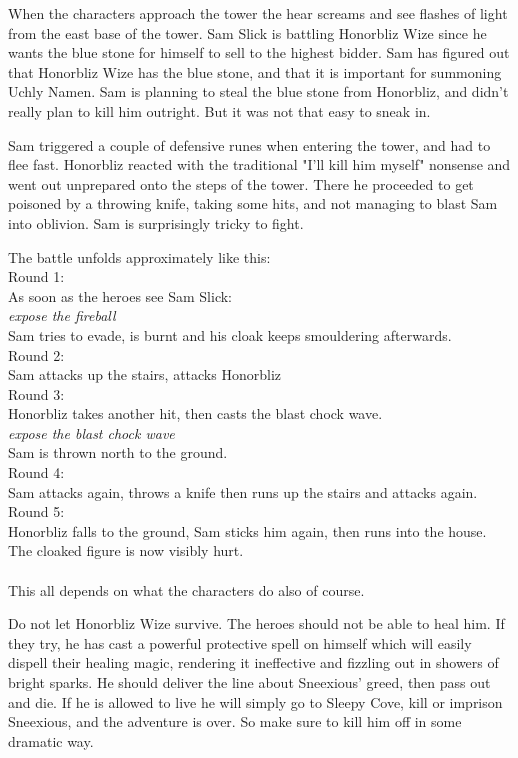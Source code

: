 \documentclass[11pt, twoside, titlepage, a4paper]{report}
\begin{document}
When the characters approach the tower the hear screams and see flashes of light from the east base of the tower. Sam Slick is battling Honorbliz Wize since he wants the blue stone for himself to sell to the highest bidder. Sam has figured out that Honorbliz Wize has the blue stone, and that it is important for summoning Uchly Namen. Sam is planning to steal the blue stone from Honorbliz, and didn't really plan to kill him outright. But it was not that easy to sneak in.

Sam triggered a couple of defensive runes when entering the tower, and had to flee fast. Honorbliz reacted with the traditional "I'll kill him myself" nonsense and went out unprepared onto the steps of the tower. There he proceeded to get poisoned by a throwing knife, taking some hits, and not managing to blast Sam into oblivion. Sam is surprisingly tricky to fight.

The battle unfolds approximately like this: \\
Round 1: \\
As soon as the heroes see Sam Slick: \\
\emph{expose the fireball} \\
Sam tries to evade, is burnt and his cloak keeps smouldering afterwards. \\
Round 2: \\
Sam attacks up the stairs, attacks Honorbliz \\
Round 3: \\
Honorbliz takes another hit, then casts the blast chock wave. \\
\emph{expose the blast chock wave} \\
Sam is thrown north to the ground. \\
Round 4:  \\
Sam attacks again, throws a knife then runs up the stairs and attacks again. \\
Round 5: \\
Honorbliz falls to the ground, Sam sticks him again, then runs into the house. The cloaked figure is now visibly hurt. \\
\\
This all depends on what the characters do also of course.

Do not let Honorbliz Wize survive. The heroes should not be able to heal him. If they try, he has cast a powerful protective spell on himself which will easily dispell their healing magic, rendering it ineffective and fizzling out in showers of bright sparks. He should deliver the line about Sneexious' greed, then pass out and die.
If he is allowed to live he will simply go to Sleepy Cove, kill or imprison Sneexious, and the adventure is over. So make sure to kill him off in some dramatic way.
\end{document}
